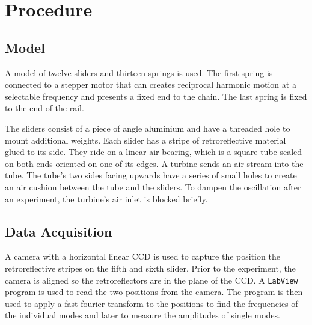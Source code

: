 \chapter{Procedure}
\section{Model}
A model of twelve sliders and thirteen springs is used.
The first spring is connected to a stepper motor that can creates reciprocal harmonic motion at a selectable frequency and presents a fixed end to the chain.
The last spring is fixed to the end of the rail.

The sliders consist of a piece of angle aluminium and have a threaded hole to mount additional weights.
Each slider has a stripe of retroreflective material glued to its side.
They ride on a linear air bearing, which is a square tube sealed on both ends oriented on one of its edges.
A turbine sends an air stream into the tube.
The tube's two sides facing upwards have a series of small holes to create an air cushion between the tube and the sliders.
To dampen the oscillation after an experiment, the turbine's air inlet is blocked briefly.

\section{Data Acquisition}\label{sec:data_acq}
A camera with a horizontal linear CCD is used to capture the position the retroreflective stripes on the fifth and sixth slider.
Prior to the experiment, the camera is aligned so the retroreflectors are in the plane of the CCD.
A \texttt{LabView} program is used to read the two positions from the camera.
The program is then used to apply a fast fourier transform to the positions to find the frequencies of the individual modes and later to measure the amplitudes of single modes.
